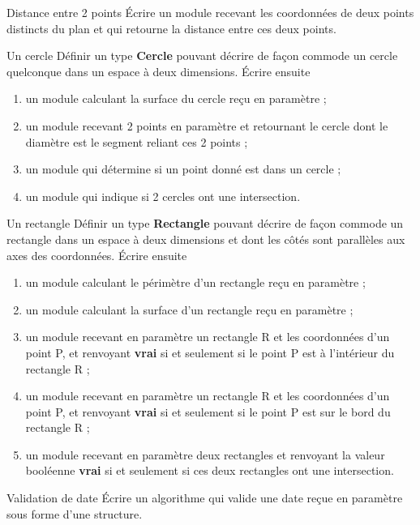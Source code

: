 \begin{Exercice}{Distance entre 2 points}
	Écrire un module recevant les coordonnées de
	deux points distincts du plan et qui retourne
	la distance entre ces deux points.
\end{Exercice}

\begin{Exercice}{Un cercle}
	Définir un type \textbf{Cercle} pouvant décrire de façon
	commode un cercle quelconque dans un espace à deux dimensions. 	
	Écrire ensuite
	
	\begin{enumerate}[label=\alph*)]
	\item {
		un module calculant la surface du cercle reçu en paramètre ;}
	\item {
		un module recevant 2 points en paramètre et retournant le cercle dont le
		diamètre est le segment reliant ces 2 points ;}
	\item {
		un module qui détermine si un point donné est dans un cercle ;}
	\item {
		un module qui indique si 2 cercles ont une intersection.
	}
	\end{enumerate}
\end{Exercice}


\begin{Exercice}{Un rectangle}
	Définir un type \textbf{Rectangle} pouvant décrire de façon
	commode un rectangle dans un espace à deux dimensions et dont les côtés
	sont parallèles aux axes des coordonnées. 	
	Écrire ensuite

	\begin{enumerate}[label=\alph*)]
	\item {
		un module calculant le périmètre d’un rectangle reçu en paramètre ;}
	\item {
		un module calculant la surface d’un rectangle reçu en paramètre ;}
	\item {
		un module recevant en paramètre un rectangle R et les coordonnées
		d’un point P, et renvoyant 
		\textbf{vrai} si et seulement si le point P est à
		l’intérieur du rectangle R ;}
	\item {
		un module recevant en paramètre un rectangle R et les coordonnées
		d’un point P, et renvoyant 
		\textbf{vrai} si et seulement si le point P est sur le bord du
		rectangle R ;}
	\item {
		un module recevant en paramètre deux rectangles et renvoyant la valeur
		booléenne \textbf{vrai} si et seulement si ces deux rectangles ont une
		intersection.}
	\end{enumerate}
\end{Exercice}

\begin{Exercice}{Validation de date}
	Écrire un algorithme qui valide une date reçue en paramètre 
	sous forme d’une structure.
\end{Exercice}

	
